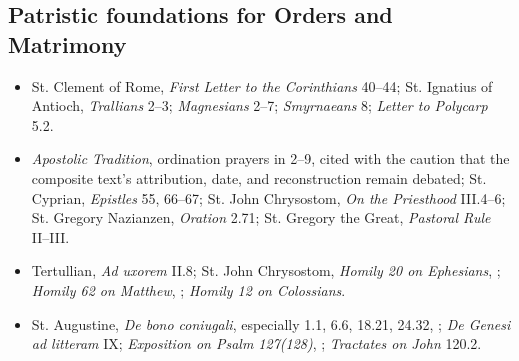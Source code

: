 \subsection*{Patristic foundations for Orders and Matrimony}
{\footnotesize
\begin{itemize}[itemsep=0.18em,topsep=0.25em]
\item St. Clement of Rome, \emph{First Letter to the Corinthians} 40--44; St. Ignatius of Antioch, \emph{Trallians} 2--3; \emph{Magnesians} 2--7; \emph{Smyrnaeans} 8; \emph{Letter to Polycarp} 5.2.
\item \emph{Apostolic Tradition}, ordination prayers in 2--9, cited with the caution that the composite text's attribution, date, and reconstruction remain debated; St. Cyprian, \emph{Epistles} 55, 66--67; St. John Chrysostom, \emph{On the Priesthood} III.4--6; St. Gregory Nazianzen, \emph{Oration} 2.71; St. Gregory the Great, \emph{Pastoral Rule} II--III.
\item Tertullian, \emph{Ad uxorem} II.8; St. John Chrysostom, \emph{Homily 20 on Ephesians}, ; \emph{Homily 62 on Matthew}, ; \emph{Homily 12 on Colossians}.
\item St. Augustine, \emph{De bono coniugali}, especially 1.1, 6.6, 18.21, 24.32, ; \emph{De Genesi ad litteram} IX; \emph{Exposition on Psalm 127(128)}, ; \emph{Tractates on John} 120.2.
\end{itemize}
}

